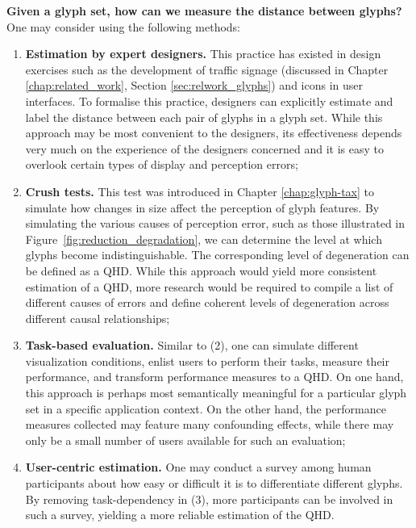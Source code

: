 \noindent\textbf{Given a glyph set, how can we measure the distance between glyphs?} One may consider using the following methods:
\begin{enumerate}
\vspace{-1mm}
\item \textbf{Estimation by expert designers.} This practice has existed in design exercises such as the development of traffic signage (discussed in Chapter \ref{chap:related_work}, Section \ref{sec:relwork_glyphs}) and icons in user interfaces.
To formalise this practice, designers can explicitly estimate and label the distance between each pair of glyphs in a glyph set.
While this approach may be most convenient to the designers, its effectiveness depends very much on the experience of the designers concerned and it is easy to overlook certain types of display and perception errors;
\vspace{-1mm}
\item \textbf{Crush tests.} This test was introduced in Chapter \ref{chap:glyph-tax} to simulate how changes in size affect the perception of glyph features.
By simulating the various causes of perception error, such as those illustrated in Figure~\ref{fig:reduction_degradation}, we can determine the level at which glyphs become indistinguishable.
The corresponding level of degeneration can be defined as a QHD.
While this approach would yield more consistent estimation of a QHD, more research would be required to compile a list of different causes of errors and define coherent levels of degeneration across different causal relationships;
\vspace{-1mm}
\item \textbf{Task-based evaluation.} Similar to (2), one can simulate different visualization conditions, enlist users to perform their tasks, measure their performance, and transform performance measures to a QHD.
On one hand, this approach is perhaps most semantically meaningful for a particular glyph set in a specific application context.
On the other hand, the performance measures collected may feature many confounding effects, while there may only be a small number of users available for such an evaluation;
\vspace{-1mm}
\item \textbf{User-centric estimation.} One may conduct a survey among human participants about how easy or difficult it is to differentiate different glyphs. By removing task-dependency in (3), more participants can be involved in such a survey, yielding a more reliable estimation of the QHD.

\end{enumerate}
